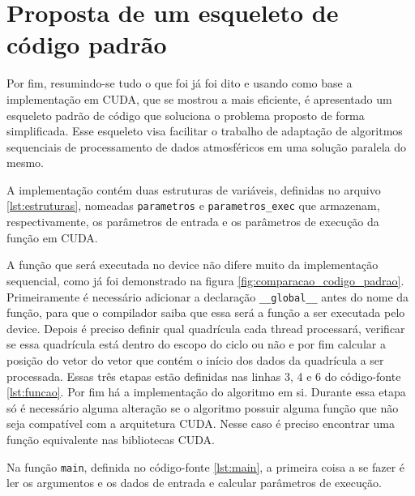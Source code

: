 \chapter{Proposta de um esqueleto de código padrão}

Por fim, resumindo-se tudo o que foi já foi dito e usando como base a implementação em CUDA, que se mostrou a mais eficiente, é apresentado um esqueleto padrão de código que soluciona o problema proposto de forma simplificada. Esse esqueleto visa facilitar o trabalho de adaptação de algoritmos sequenciais de processamento de dados atmosféricos em uma solução paralela do mesmo.

A implementação contém duas estruturas de variáveis, definidas no arquivo \ref{lst:estruturas}, nomeadas \texttt{parametros} e \texttt{parametros\_exec} que armazenam, respectivamente, os parâmetros de entrada e os parâmetros de execução da função em CUDA.



A função que será executada no device não difere muito da implementação sequencial, como já foi demonstrado na figura \ref{fig:comparacao_codigo_padrao}. Primeiramente é necessário adicionar a declaração \texttt{\_\_global\_\_} antes do nome da função, para que o compilador saiba que essa será a função a ser executada pelo device. Depois é preciso definir qual quadrícula cada thread processará, verificar se essa quadrícula está dentro do escopo do ciclo ou não e por fim calcular a posição do vetor do vetor que contém o início dos dados da quadrícula a ser processada. Essas três etapas estão definidas nas linhas 3, 4 e 6 do código-fonte \ref{lst:funcao}. Por fim há a implementação do algoritmo em si. Durante essa etapa só é necessário alguma alteração se o algoritmo possuir alguma função que não seja compatível com a arquitetura CUDA. Nesse caso é preciso encontrar uma função equivalente nas bibliotecas CUDA.



Na função \texttt{main}, definida no código-fonte \ref{lst:main}, a primeira coisa a se fazer é ler os argumentos e os dados de entrada e calcular parâmetros de execução.


